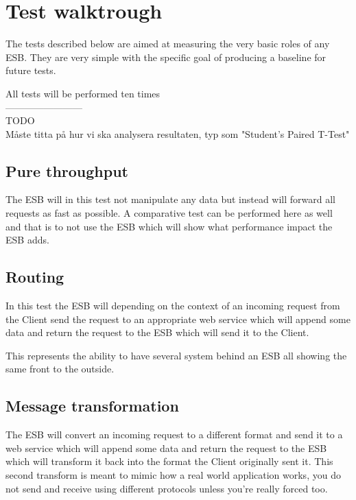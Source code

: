 \documentclass[11pt]{article} %
\begin{document}
\section{Test walktrough}
The tests described below are aimed at measuring the very basic roles of any ESB. They are very simple with the specific goal of producing a baseline for future tests.

All tests will be performed ten times 
\\
------------------------ \\
TODO \\
Måste titta på hur vi ska analysera resultaten, typ som "Student’s Paired T-Test"

\subsection{Pure throughput}
The ESB will in this test not manipulate any data but instead will forward all requests as fast as possible. 
A comparative test can be performed here as well and that is to not use the ESB which will show what performance impact the ESB adds. 


\subsection{Routing}
In this test the ESB will depending on the context of an incoming request from the Client send the request to an appropriate web service which will append some data and return the request to the ESB which will send it to the Client.

This represents the ability to have several system behind an ESB all showing the same front to the outside.

\subsection{Message transformation}
The ESB will convert an incoming request to a different format and send it to a web service which will append some data and return the request to the ESB which will transform it back into the format the Client originally sent it. This second transform is meant to mimic how a real world application works, you do not send and receive using different protocols unless you're really forced too. 
\end{document}
